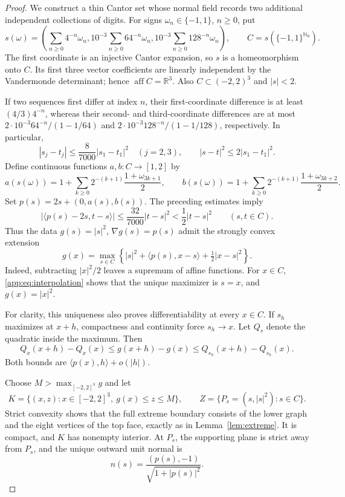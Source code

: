 \documentclass[11pt,letterpaper]{amsart}
\theoremstyle{definition}
\theoremstyle{remark}
\numberwithin{equation}{section}
\DeclareMathOperator{\aff}{aff}
\newcommand{\R}{\mathbb R}
\newcommand{\N}{\mathbb N}
\begin{document}
\begin{proof}
We construct a thin Cantor set whose normal field records two additional
independent collections of digits. For signs $\omega_n\in\{-1,1\}$,
$n\ge0$, put
\[
 s(\omega)=\left(\sum_{n\ge0}4^{-n}\omega_n,
       10^{-3}\sum_{n\ge0}64^{-n}\omega_n,
       10^{-3}\sum_{n\ge0}128^{-n}\omega_n\right),
 \qquad C=s(\{-1,1\}^{\N_0}).
\]
The first coordinate is an injective Cantor expansion, so $s$ is a
homeomorphism onto $C$. Its first three vector coefficients are
linearly independent by the Vandermonde determinant; hence
$\aff C=\R^3$. Also $C\subset(-2,2)^3$ and $|s|<2$.

If two sequences first differ at index $n$, their first-coordinate
difference is at least $(4/3)4^{-n}$, whereas their second- and
third-coordinate differences are at most
$2\cdot10^{-3}64^{-n}/(1-1/64)$ and
$2\cdot10^{-3}128^{-n}/(1-1/128)$, respectively. In particular,
\begin{equation}\label{app:eq:flat}
 |s_j-t_j|\le\frac{8}{7000}|s_1-t_1|^2
       \quad(j=2,3),\qquad |s-t|^2\le2|s_1-t_1|^2.
\end{equation}
Define continuous functions $a,b:C\to[1,2]$ by
\[
 a(s(\omega))=1+\sum_{k\ge0}2^{-(k+1)}\frac{1+\omega_{3k+1}}2,
 \qquad
 b(s(\omega))=1+\sum_{k\ge0}2^{-(k+1)}\frac{1+\omega_{3k+2}}2.
\]
Set $p(s)=2s+(0,a(s),b(s))$. The preceding estimates imply
\begin{equation}\label{app:eq:interpolation}
 \bigl|\langle p(s)-2s,t-s\rangle\bigr|
       \le\frac{32}{7000}|t-s|^2<\frac12|t-s|^2
       \qquad(s,t\in C).
\end{equation}
Thus the data $g(s)=|s|^2$, $\nabla g(s)=p(s)$ admit the strongly
convex extension
\[
 g(x)=\max_{s\in C}
       \left\{|s|^2+\langle p(s),x-s\rangle+\tfrac12|x-s|^2\right\}.
\]
Indeed, subtracting $|x|^2/2$ leaves a supremum of affine functions.
For $x\in C$, \eqref{app:eq:interpolation} shows that the unique
maximizer is $s=x$, and $g(x)=|x|^2$.

For clarity, this uniqueness also proves differentiability at every
$x\in C$. If $s_h$ maximizes at $x+h$, compactness and continuity
force $s_h\to x$. Let $Q_s$ denote the quadratic inside the maximum.
Then
\[
 Q_x(x+h)-Q_x(x)\le g(x+h)-g(x)
      \le Q_{s_h}(x+h)-Q_{s_h}(x).
\]
Both bounds are $\langle p(x),h\rangle+o(|h|)$.

Choose $M>\max_{[-2,2]^3}g$ and let
\[
 K=\{(x,z):x\in[-2,2]^3,\ g(x)\le z\le M\},
 \qquad Z=\{P_s=(s,|s|^2):s\in C\}.
\]
Strict convexity shows that the full extreme boundary consists of the
lower graph and the eight vertices of the top face, exactly as in
Lemma~\ref{lem:extreme}. It is compact, and $K$ has nonempty interior.
At $P_s$, the supporting plane is strict away from $P_s$, and the unique
outward unit normal is
\[
                         n(s)=\frac{(p(s),-1)}{\sqrt{1+|p(s)|^2}}.
\]


\end{proof}
\end{document}

